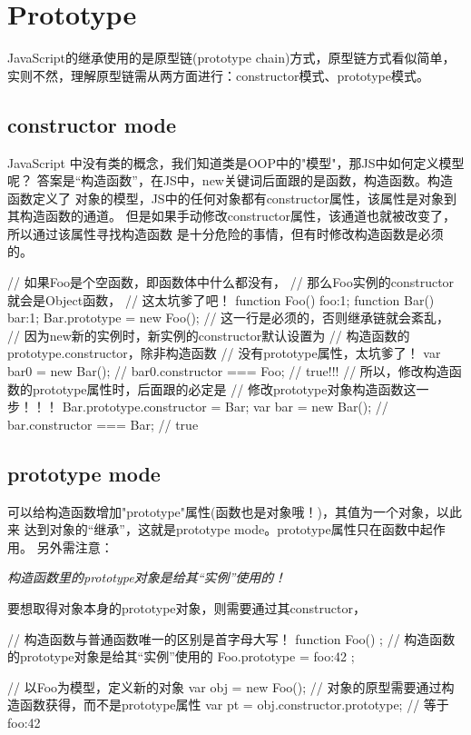 ﻿\section[Prototype]{Prototype}
JavaScript的继承使用的是原型链(prototype chain)方式，原型链方式看似简单，
实则不然，理解原型链需从两方面进行：constructor模式、prototype模式。

\subsection[constructor mode]{constructor mode}
JavaScript 中没有类的概念，我们知道类是OOP中的"模型"，那JS中如何定义模型呢？
答案是“构造函数”，在JS中，new关键词后面跟的是函数，构造函数。构造函数定义了
对象的模型，JS中的任何对象都有constructor属性，该属性是对象到其构造函数的通道。
但是如果手动修改constructor属性，该通道也就被改变了，所以通过该属性寻找构造函数
是十分危险的事情，但有时修改构造函数是必须的。

\begin{javascriptcode}
  // 如果Foo是个空函数，即函数体中什么都没有，
  // 那么Foo实例的constructor就会是Object函数，
  // 这太坑爹了吧！
  function Foo() {foo:1};
  function Bar() {bar:1};
  Bar.prototype = new Foo();
  // 这一行是必须的，否则继承链就会紊乱，
  // 因为new新的实例时，新实例的constructor默认设置为
  // 构造函数的prototype.constructor，除非构造函数
  // 没有prototype属性，太坑爹了！
  var bar0 = new Bar();
  // bar0.constructor === Foo; // true!!!
  // 所以，修改构造函数的prototype属性时，后面跟的必定是
  // 修改prototype对象构造函数这一步！！！
  Bar.prototype.constructor = Bar;
  var bar = new Bar();
  // bar.constructor === Bar; // true
\end{javascriptcode}

\subsection[prototype mode]{prototype mode}
可以给构造函数增加"prototype"属性(函数也是对象哦！)，其值为一个对象，以此来
达到对象的“继承”，这就是prototype mode。prototype属性只在函数中起作用。
另外需注意：

\emph{构造函数里的prototype对象是给其“实例”使用的！}

要想取得对象本身的prototype对象，则需要通过其constructor，

\begin{javascriptcode}
  // 构造函数与普通函数唯一的区别是首字母大写！
  function Foo() {};
  // 构造函数的prototype对象是给其“实例”使用的
  Foo.prototype = {
    foo:42
  };

  // 以Foo为模型，定义新的对象
  var obj = new Foo();
  // 对象的原型需要通过构造函数获得，而不是prototype属性
  var pt = obj.constructor.prototype; // 等于 {foo:42}
\end{javascriptcode}


